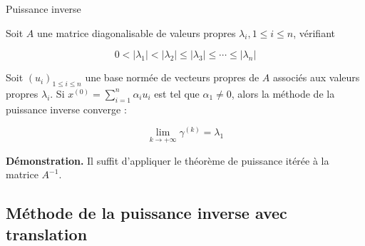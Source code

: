 \documentclass[french, 10pt]{beamer}
\theoremstyle{definition}
\begin{document}
\begin{frame}{Puissance inverse }
\begin{corollary}
    Soit $A$ une matrice diagonalisable de valeurs propres $\lambda_i, 1 \leq i \leq n$, vérifiant

$$
0<\left|\lambda_1\right|<\left|\lambda_2\right| \leq\left|\lambda_3\right| \leq \cdots \leq\left|\lambda_n\right|
$$


Soit $\left(u_i\right)_{1 \leq i \leq n}$ une base normée de vecteurs propres de $A$ associés aux valeurs propres $\lambda_i$. Si $x^{(0)}=\sum_{i=1}^n \alpha_i u_i$ est tel que $\alpha_1 \neq 0$, alors la méthode de la puissance inverse converge :

$$
\lim _{k \rightarrow+\infty} \gamma^{(k)}=\lambda_1
$$

\end{corollary}

\textbf{Démonstration.}
Il suffit d'appliquer le théorème de puissance itérée à la matrice $A^{-1}$.
\end{frame}

\subsection{Méthode de la puissance inverse avec translation}
\end{document}
